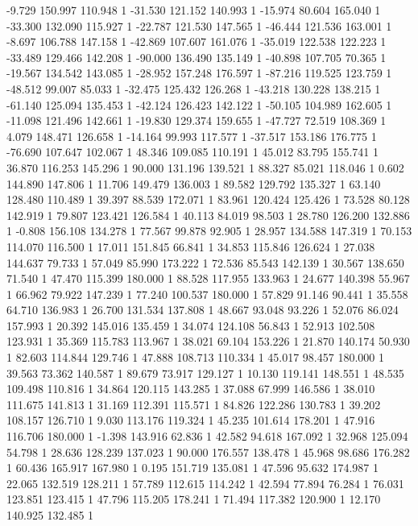 	-9.729 150.997 110.948 1
	-31.530 121.152 140.993 1
	-15.974 80.604 165.040 1
	-33.300 132.090 115.927 1
	-22.787 121.530 147.565 1
	-46.444 121.536 163.001 1
	-8.697 106.788 147.158 1
	-42.869 107.607 161.076 1
	-35.019 122.538 122.223 1
	-33.489 129.466 142.208 1
	-90.000 136.490 135.149 1
	-40.898 107.705 70.365 1
	-19.567 134.542 143.085 1
	-28.952 157.248 176.597 1
	-87.216 119.525 123.759 1
	-48.512 99.007 85.033 1
	-32.475 125.432 126.268 1
	-43.218 130.228 138.215 1
	-61.140 125.094 135.453 1
	-42.124 126.423 142.122 1
	-50.105 104.989 162.605 1
	-11.098 121.496 142.661 1
	-19.830 129.374 159.655 1
	-47.727 72.519 108.369 1
	4.079 148.471 126.658 1
	-14.164 99.993 117.577 1
	-37.517 153.186 176.775 1
	-76.690 107.647 102.067 1
	48.346 109.085 110.191 1
	45.012 83.795 155.741 1
	36.870 116.253 145.296 1
	90.000 131.196 139.521 1
	88.327 85.021 118.046 1
	0.602 144.890 147.806 1
	11.706 149.479 136.003 1
	89.582 129.792 135.327 1
	63.140 128.480 110.489 1
	39.397 88.539 172.071 1
	83.961 120.424 125.426 1
	73.528 80.128 142.919 1
	79.807 123.421 126.584 1
	40.113 84.019 98.503 1
	28.780 126.200 132.886 1
	-0.808 156.108 134.278 1
	77.567 99.878 92.905 1
	28.957 134.588 147.319 1
	70.153 114.070 116.500 1
	17.011 151.845 66.841 1
	34.853 115.846 126.624 1
	27.038 144.637 79.733 1
	57.049 85.990 173.222 1
	72.536 85.543 142.139 1
	30.567 138.650 71.540 1
	47.470 115.399 180.000 1
	88.528 117.955 133.963 1
	24.677 140.398 55.967 1
	66.962 79.922 147.239 1
	77.240 100.537 180.000 1
	57.829 91.146 90.441 1
	35.558 64.710 136.983 1
	26.700 131.534 137.808 1
	48.667 93.048 93.226 1
	52.076 86.024 157.993 1
	20.392 145.016 135.459 1
	34.074 124.108 56.843 1
	52.913 102.508 123.931 1
	35.369 115.783 113.967 1
	38.021 69.104 153.226 1
	21.870 140.174 50.930 1
	82.603 114.844 129.746 1
	47.888 108.713 110.334 1
	45.017 98.457 180.000 1
	39.563 73.362 140.587 1
	89.679 73.917 129.127 1
	10.130 119.141 148.551 1
	48.535 109.498 110.816 1
	34.864 120.115 143.285 1
	37.088 67.999 146.586 1
	38.010 111.675 141.813 1
	31.169 112.391 115.571 1
	84.826 122.286 130.783 1
	39.202 108.157 126.710 1
	9.030 113.176 119.324 1
	45.235 101.614 178.201 1
	47.916 116.706 180.000 1
	-1.398 143.916 62.836 1
	42.582 94.618 167.092 1
	32.968 125.094 54.798 1
	28.636 128.239 137.023 1
	90.000 176.557 138.478 1
	45.968 98.686 176.282 1
	60.436 165.917 167.980 1
	0.195 151.719 135.081 1
	47.596 95.632 174.987 1
	22.065 132.519 128.211 1
	57.789 112.615 114.242 1
	42.594 77.894 76.284 1
	76.031 123.851 123.415 1
	47.796 115.205 178.241 1
	71.494 117.382 120.900 1
	12.170 140.925 132.485 1
